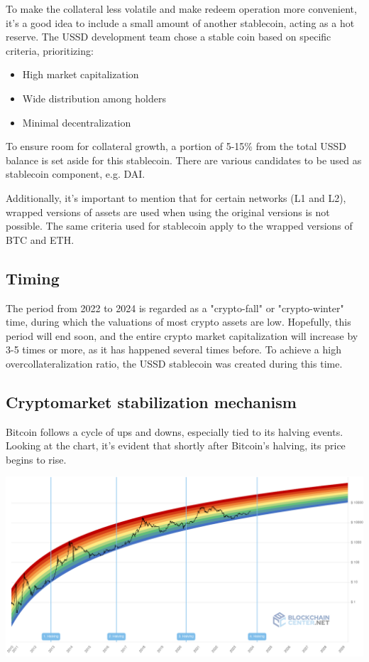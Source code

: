To make the collateral less volatile and make redeem operation more convenient, it's a good idea to include a small amount of another stablecoin, acting as a hot reserve. The USSD development team chose a stable coin based on specific criteria, prioritizing:

\begin{itemize}
	\item High market capitalization
	\item Wide distribution among holders
	\item Minimal decentralization
\end{itemize}

To ensure room for collateral growth, a portion of 5-15\% from the total USSD balance is set aside for this stablecoin. There are various candidates to be used as stablecoin component, e.g. DAI.

Additionally, it's important to mention that for certain networks (L1 and L2), wrapped versions of assets are used when using the original versions is not possible. The same criteria used for stablecoin apply to the wrapped versions of BTC and ETH.

\subsection{Timing}

The period from 2022 to 2024 is regarded as a "crypto-fall" or "crypto-winter" time, during which the valuations of most crypto assets are low. Hopefully, this period will end soon, and the entire crypto market capitalization will increase by 3-5 times or more, as it has happened several times before. To achieve a high overcollateralization ratio, the USSD stablecoin was created during this time.

\subsection{Cryptomarket stabilization mechanism}

Bitcoin follows a cycle of ups and downs, especially tied to its halving events. Looking at the chart, it's evident that shortly after Bitcoin's halving, its price begins to rise.

\centerline{\includegraphics[scale=0.32]{image03.png}}

